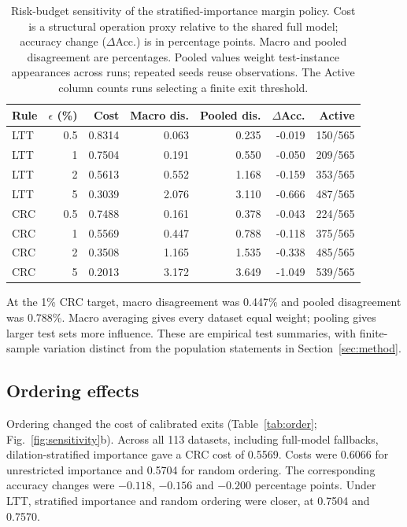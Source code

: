 \documentclass[pdflatex,sn-basic,Numbered]{sn-jnl}
\begin{document}
\begin{table}[htbp]
\centering\small
\caption{Risk-budget sensitivity of the stratified-importance margin policy. Cost is a structural operation proxy relative to the shared full model; accuracy change ($\Delta$Acc.) is in percentage points. Macro and pooled disagreement are percentages. Pooled values weight test-instance appearances across runs; repeated seeds reuse observations. The Active column counts runs selecting a finite exit threshold.}\label{tab:budget}
\setlength{\tabcolsep}{4pt}
\begin{tabular}{|l|r|r|r|r|r|r|}
\hline\hline
\textbf{Rule} & \textbf{$\epsilon$ (\%)} & \textbf{Cost} & \textbf{Macro dis.} & \textbf{Pooled dis.} & \textbf{$\Delta$Acc.} & \textbf{Active} \\
\hline
LTT & 0.5 & 0.8314 & 0.063 & 0.235 & -0.019 & 150/565 \\
\hline
LTT & 1 & 0.7504 & 0.191 & 0.550 & -0.050 & 209/565 \\
\hline
LTT & 2 & 0.5613 & 0.552 & 1.168 & -0.159 & 353/565 \\
\hline
LTT & 5 & 0.3039 & 2.076 & 3.110 & -0.666 & 487/565 \\
\hline
CRC & 0.5 & 0.7488 & 0.161 & 0.378 & -0.043 & 224/565 \\
\hline
CRC & 1 & 0.5569 & 0.447 & 0.788 & -0.118 & 375/565 \\
\hline
CRC & 2 & 0.3508 & 1.165 & 1.535 & -0.338 & 485/565 \\
\hline
CRC & 5 & 0.2013 & 3.172 & 3.649 & -1.049 & 539/565 \\
\hline
\hline\hline
\end{tabular}
\end{table}

At the 1\% CRC target, macro disagreement was 0.447\% and pooled disagreement was 0.788\%. Macro averaging gives every dataset equal weight; pooling gives larger test sets more influence. These are empirical test summaries, with finite-sample variation distinct from the population statements in Section~\ref{sec:method}.

\subsection{Ordering effects}
Ordering changed the cost of calibrated exits (Table~\ref{tab:order}; Fig.~\ref{fig:sensitivity}b). Across all 113 datasets, including full-model fallbacks, dilation-stratified importance gave a CRC cost of 0.5569. Costs were 0.6066 for unrestricted importance and 0.5704 for random ordering. The corresponding accuracy changes were $-0.118$, $-0.156$ and $-0.200$ percentage points. Under LTT, stratified importance and random ordering were closer, at 0.7504 and 0.7570.
\end{document}
